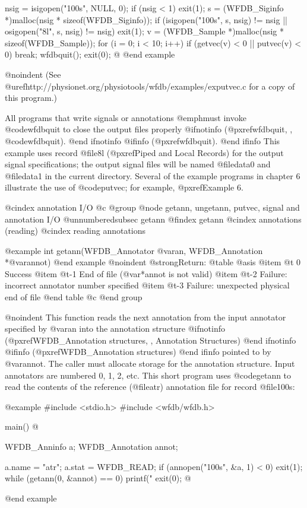 {{{{{{{{{    nsig = isigopen("100s", NULL, 0);
    if (nsig < 1)
        exit(1);
    s = (WFDB_Siginfo *)malloc(nsig * sizeof(WFDB_Siginfo));
    if (isigopen("100s", s, nsig) != nsig || 
        osigopen("8l", s, nsig) != nsig)
        exit(1);
    v = (WFDB_Sample *)malloc(nsig * sizeof(WFDB_Sample));
    for (i = 0; i < 10; i++)
        if (getvec(v) < 0 || putvec(v) < 0)
            break;
    wfdbquit();
    exit(0);
@}
@end example

@noindent
(See @uref{http://physionet.org/physiotools/wfdb/examples/exputvec.c}
for a copy of this program.)

All programs that write signals or annotations @emph{must} invoke
@code{wfdbquit} to close the output files properly
@ifnotinfo
(@pxref{wfdbquit, , @code{wfdbquit}}).
@end ifnotinfo
@ifinfo
(@pxref{wfdbquit}).
@end ifinfo
This example uses record @file{8l} (@pxref{Piped and Local Records}) for the
output signal specifications; the output signal files will be named
@file{data0} and @file{data1} in the current directory.  Several of the example
programs in chapter 6 illustrate the use of @code{putvec}; for example,
@pxref{Example 6}.

@cindex annotation I/O
@c @group
@node     getann, ungetann, putvec, signal and annotation I/O
@unnumberedsubsec getann
@findex getann
@cindex annotations (reading)
@cindex reading annotations

@example
int getann(WFDB_Annotator @var{an}, WFDB_Annotation *@var{annot})
@end example
@noindent
@strong{Return:}
@table @asis
@item @t{ 0}
Success
@item @t{-1}
End of file (@var{*annot} is not valid)
@item @t{-2}
Failure: incorrect annotator number specified
@item @t{-3}
Failure: unexpected physical end of file
@end table
@c @end group

@noindent
This function reads the next annotation from the input annotator
specified by @var{an} into the annotation structure
@ifnotinfo
(@pxref{WFDB_Annotation structures, , Annotation Structures})
@end ifnotinfo
@ifinfo
(@pxref{WFDB_Annotation structures})
@end ifinfo
pointed to by @var{annot}.  The caller must allocate storage for the
annotation structure.  Input annotators are numbered 0, 1, 2, etc.  This
short program uses @code{getann} to read the contents of the reference
(@file{atr}) annotation file for record @file{100s}:

@example
#include <stdio.h>
#include <wfdb/wfdb.h>

main()
@{
    WFDB_Anninfo a;
    WFDB_Annotation annot;

    a.name = "atr"; a.stat = WFDB_READ;
    if (annopen("100s", &a, 1) < 0)
        exit(1);
    while (getann(0, &annot) == 0)
        printf("%
    exit(0);
@}
@end example

}}}}}}}}
